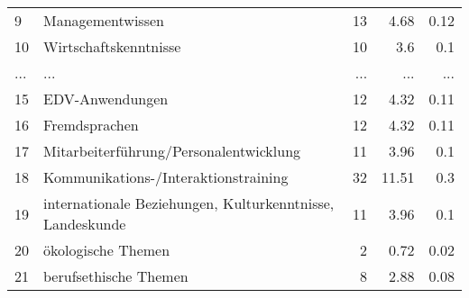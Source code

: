 \begin{longtable}{lXrrr}
        9 & \multicolumn{1}{X}{Managementwissen} & %
          \num{13} &
          \num[round-mode=places,round-precision=2]{4,68} &
          \num[round-mode=places,round-precision=2]{0,12} \\
        10 & \multicolumn{1}{X}{Wirtschaftskenntnisse} & %
          \num{10} &
          \num[round-mode=places,round-precision=2]{3,6} &
          \num[round-mode=places,round-precision=2]{0,1} \\
       ... & ... & ... & ... & ... \\
        15 & \multicolumn{1}{X}{EDV-Anwendungen} & %
          \num{12} &
          \num[round-mode=places,round-precision=2]{4,32} &
          \num[round-mode=places,round-precision=2]{0,11} \\

        16 & \multicolumn{1}{X}{Fremdsprachen} & %
          \num{12} &
          \num[round-mode=places,round-precision=2]{4,32} &
          \num[round-mode=places,round-precision=2]{0,11} \\

        17 & \multicolumn{1}{X}{Mitarbeiterführung/Personalentwicklung} & %
          \num{11} &
          \num[round-mode=places,round-precision=2]{3,96} &
          \num[round-mode=places,round-precision=2]{0,1} \\

        18 & \multicolumn{1}{X}{Kommunikations-/Interaktionstraining} & %
          \num{32} &
          \num[round-mode=places,round-precision=2]{11,51} &
          \num[round-mode=places,round-precision=2]{0,3} \\

        19 & \multicolumn{1}{X}{internationale Beziehungen, Kulturkenntnisse, Landeskunde} & %
          \num{11} &
          \num[round-mode=places,round-precision=2]{3,96} &
          \num[round-mode=places,round-precision=2]{0,1} \\

        20 & \multicolumn{1}{X}{ökologische Themen} & %
          \num{2} &
          \num[round-mode=places,round-precision=2]{0,72} &
          \num[round-mode=places,round-precision=2]{0,02} \\

        21 & \multicolumn{1}{X}{berufsethische Themen} & %
          \num{8} &
          \num[round-mode=places,round-precision=2]{2,88} &
          \num[round-mode=places,round-precision=2]{0,08} \\


\end{longtable}
